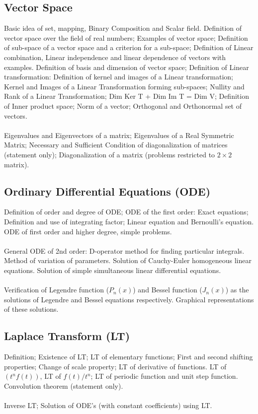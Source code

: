 \documentclass[12pt]{article}
\begin{document}
\subsection{Vector Space}
Basic idea of set, mapping, Binary Composition and Scalar field. Definition of vector space over the field of real numbers; Examples of vector space; Definition of sub-space of a vector space and a criterion for a sub-space; Definition of Linear combination, Linear independence and linear dependence of vectors with
examples. Definition of basis and dimension of vector space; Definition of Linear transformation: Definition of kernel and images of a Linear transformation; Kernel and Images of a Linear Transformation forming sub-spaces; Nullity and Rank of a Linear Transformation; Dim Ker T + Dim Im T = Dim V; Definition of Inner product space; Norm of a vector; Orthogonal and Orthonormal set of vectors.\\ \\
Eigenvalues and Eigenvectors of a matrix; Eigenvalues of a Real Symmetric Matrix; Necessary and
Sufficient Condition of diagonalization of matrices (statement only); Diagonalization of a matrix (problems restricted to $2\times 2$ matrix).
\subsection{Ordinary Differential Equations (ODE)}
Definition of order and degree of ODE; ODE of the first order: Exact equations; Definition and use of integrating factor; Linear equation and Bernoulli’s equation. ODE of first order and higher degree, simple problems.\\ \\ 
General ODE of 2nd order: D-operator method for finding particular integrals. Method of variation of parameters. Solution of Cauchy-Euler homogeneous linear equations. Solution of simple simultaneous linear differential equations.\\ \\
Verification of Legendre function ($P_n (x)$) and Bessel function ($J_n (x)$) as the solutions of Legendre and Bessel equations respectively. Graphical representations of these solutions.
\subsection{Laplace Transform (LT)}
Definition; Existence of LT; LT of elementary functions; First and second shifting properties; Change of scale property; LT of derivative of functions. LT of $(t^n f(t))$, LT of $f(t)/t^n$; LT of periodic function and unit step function. Convolution theorem (statement only).\\ \\
Inverse LT; Solution of ODE's (with constant coefficients) using LT.
\end{document}
